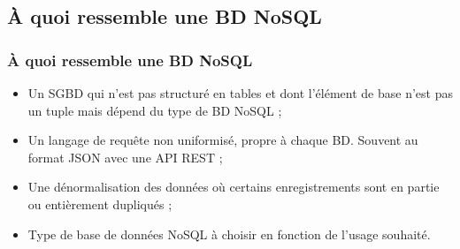 	\subsection{À quoi ressemble une BD NoSQL}
	\begin{frame}
		\frametitle{À quoi ressemble une BD NoSQL}

		\begin{itemize}
			\item Un SGBD qui n'est pas structuré en tables et dont l'élément de base n'est pas un tuple mais dépend du type de BD NoSQL ;
			\item Un langage de requête non uniformisé, propre à chaque BD. Souvent au format JSON avec une API REST ;
			\item Une dénormalisation des données où certains enregistrements sont en partie ou entièrement dupliqués ;
			\item Type de base de données NoSQL à choisir en fonction de l'usage souhaité.
		\end{itemize}

	\end{frame}